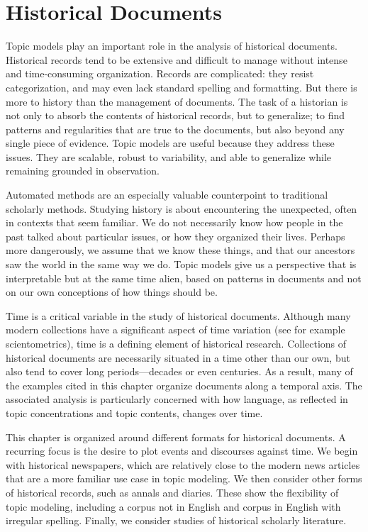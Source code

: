
\chapter{Historical Documents}
\label{ch:nonfiction}

Topic models play an important role in the analysis of historical documents.
Historical records tend to be extensive and difficult to manage without intense and time-consuming organization.
Records are complicated: they resist categorization, and may even lack standard spelling and formatting.
But there is more to history than the management of documents.
The task of a historian is not only to absorb the contents of historical records, but to generalize; to find patterns and regularities that are true to the documents, but also beyond any single piece of evidence.
Topic models are useful because they address these issues. They are scalable, robust to variability, and able to generalize while remaining grounded in observation.

Automated methods are an especially valuable counterpoint to traditional scholarly methods.
Studying history is about encountering the unexpected, often in contexts that seem familiar.
We do not necessarily know how people in the past talked about particular issues, or how they organized their lives.
Perhaps more dangerously, we assume that we know these things, and that our ancestors saw the world in the same way we do.
Topic models give us a perspective that is interpretable but at the same time alien, based on patterns in documents and not on our own conceptions of how things should be.

Time is a critical variable in the study of historical documents.
Although many modern collections have a significant aspect of time variation (see for example scientometrics), time is a defining element of historical research.
Collections of historical documents are necessarily situated in a time other than our own, but also tend to cover long periods---decades or even centuries.
As a result, many of the examples cited in this chapter organize documents along a temporal axis.
The associated analysis is particularly concerned with how language, as reflected in topic concentrations and topic contents, changes over time.

This chapter is organized around different formats for historical documents.
A recurring focus is the desire to plot events and discourses against time.
We begin with historical newspapers, which are relatively close to the modern news articles that are a more familiar use case in topic modeling.
We then consider other forms of historical records, such as annals and diaries.
These show the flexibility of topic modeling, including a corpus not in English and corpus in English with irregular spelling.
Finally, we consider studies of historical scholarly literature.

